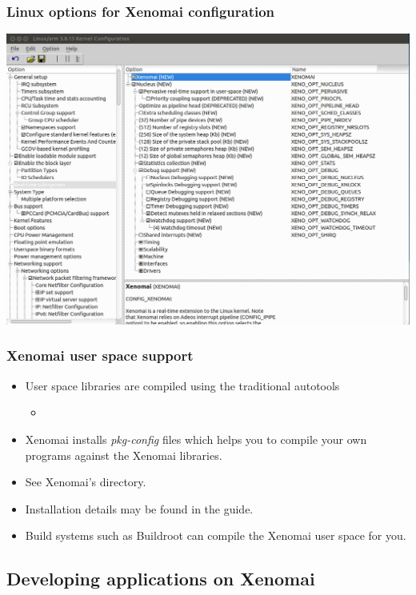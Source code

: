 \begin{frame}
  \frametitle{Linux options for Xenomai configuration}
  \begin{center}
    \includegraphics[width=\textwidth]{slides/sysdev-realtime/xenomai-kernel-config.png}
  \end{center}
\end{frame}

\begin{frame}
  \frametitle{Xenomai user space support}
  \begin{itemize}
  \item User space libraries are compiled using the traditional autotools
    \begin{itemize}
    \item {}
    \end{itemize}
  \item Xenomai installs {\em pkg-config} files which helps you to
    compile your own programs against the Xenomai libraries.
  \item See Xenomai's  directory.
  \item Installation details may be found in the 
    guide.
  \item Build systems such as Buildroot can compile the Xenomai user space
    for you.
  \end{itemize}
\end{frame}

\subsection{Developing applications on Xenomai}

